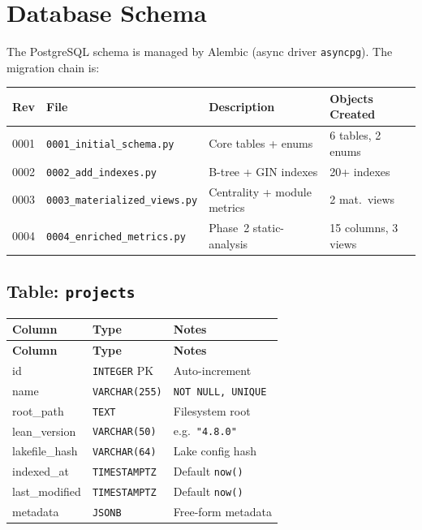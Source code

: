 
\section{Database Schema}
\label{sec:database-schema}

The PostgreSQL schema is managed by Alembic (async driver \texttt{asyncpg}).
The migration chain is:

\begin{center}
\begin{tabular}{@{}clll@{}}
\toprule
\textbf{Rev} & \textbf{File} & \textbf{Description} & \textbf{Objects Created} \\
\midrule
0001 & \texttt{0001\_initial\_schema.py} & Core tables + enums & 6 tables, 2 enums \\
0002 & \texttt{0002\_add\_indexes.py}    & B-tree + GIN indexes & 20+ indexes \\
0003 & \texttt{0003\_materialized\_views.py} & Centrality + module metrics & 2 mat.\ views \\
0004 & \texttt{0004\_enriched\_metrics.py}  & Phase~2 static-analysis & 15 columns, 3 views \\
\bottomrule
\end{tabular}
\end{center}

\subsection{Table: \texttt{projects}}

\begin{longtable}{@{}llp{6.5cm}@{}}
\toprule
\textbf{Column} & \textbf{Type} & \textbf{Notes} \\
\midrule
\endfirsthead
\toprule
\textbf{Column} & \textbf{Type} & \textbf{Notes} \\
\midrule
\endhead
\bottomrule
\endfoot
id              & \texttt{INTEGER} PK  & Auto-increment \\
name            & \texttt{VARCHAR(255)} & \texttt{NOT NULL, UNIQUE} \\
root\_path      & \texttt{TEXT}         & Filesystem root \\
lean\_version   & \texttt{VARCHAR(50)}  & e.g.\ \texttt{"4.8.0"} \\
lakefile\_hash  & \texttt{VARCHAR(64)}  & Lake config hash \\
indexed\_at     & \texttt{TIMESTAMPTZ}  & Default \texttt{now()} \\
last\_modified  & \texttt{TIMESTAMPTZ}  & Default \texttt{now()} \\
metadata        & \texttt{JSONB}        & Free-form metadata \\
\end{longtable}

